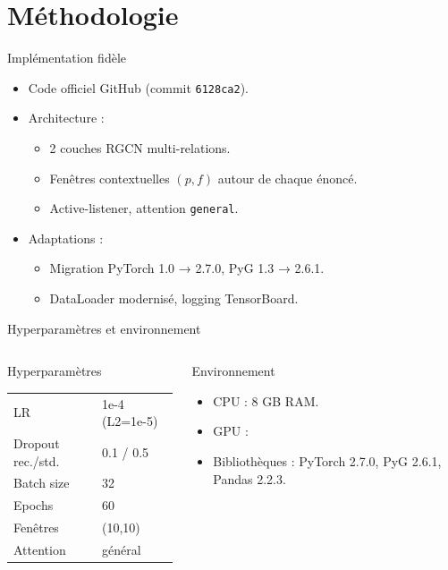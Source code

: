 \documentclass[10pt,aspectratio=169]{beamer}
\begin{document}
\section{Méthodologie}
\begin{frame}{Implémentation fidèle}
  \begin{itemize}
    \item Code officiel GitHub (commit \texttt{6128ca2}).
    \item Architecture :
      \begin{itemize}
        \item 2 couches RGCN multi-relations.
        \item Fenêtres contextuelles $(p,f)$ autour de chaque énoncé.
        \item Active-listener, attention \texttt{general}.
      \end{itemize}
    \item Adaptations :
      \begin{itemize}
        \item Migration PyTorch 1.0 → 2.7.0, PyG 1.3 → 2.6.1.
        \item DataLoader modernisé, logging TensorBoard.
      \end{itemize}
  \end{itemize}
\end{frame}

\begin{frame}{Hyperparamètres et environnement}
  \begin{columns}
    \begin{block}{Hyperparamètres}
      \small
      \begin{tabular}{ll}
        LR & 1e-4 (L2=1e-5) \\
        Dropout rec./std. & 0.1 / 0.5 \\
        Batch size & 32 \\
        Epochs & 60 \\
        Fenêtres & (10,10) \\
        Attention & général \\
      \end{tabular}
    \end{block}
    \begin{block}{Environnement}
      \begin{itemize}
        \item CPU : 8 GB RAM.
        \item GPU : 
        \item Bibliothèques : PyTorch 2.7.0, PyG 2.6.1, Pandas 2.2.3.
      \end{itemize}
    \end{block}
  \end{columns}
\end{frame}
\end{document}
